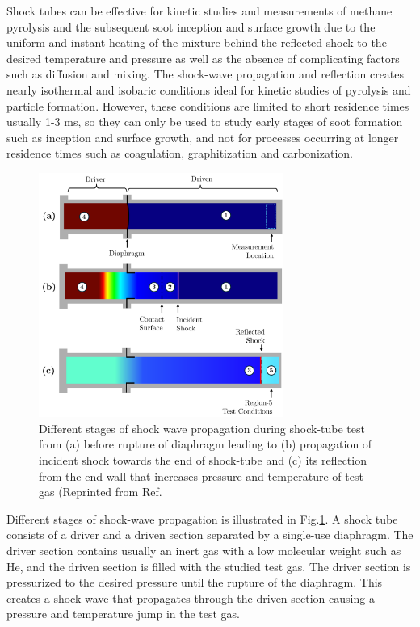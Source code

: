 Shock tubes can be effective for kinetic studies and measurements of methane pyrolysis and the subsequent soot inception and surface growth due to the uniform and instant heating of the mixture behind the reflected shock to the desired temperature and pressure as well as the absence of complicating factors such as diffusion and mixing. The shock-wave propagation and reflection creates nearly isothermal and isobaric conditions ideal for kinetic studies of pyrolysis and particle formation. However, these conditions are limited to short residence times usually 1-3 ms, so they can only be used to study early stages of soot formation such as inception and surface growth, and not for processes occurring at longer residence times such as coagulation, graphitization and carbonization.

\begin{figure}[!htbp]
	\centering
	\includegraphics[height=80mm, ]{Figures/Results/Shocktube/shockwavestages.pdf}
	\caption{Different stages of shock wave propagation during shock-tube test from (a) before rupture of diaphragm leading to (b) propagation of incident shock towards the end of shock-tube and (c) its reflection from the end wall that increases pressure and temperature of test gas (Reprinted from Ref.~\citep{HansonGroupShockTube}}
	\label{fig:shockwave}
\end{figure}

Different stages of shock-wave propagation is illustrated in Fig.\ref{fig:shockwave}. A shock tube consists of a driver and a driven section separated by a single-use diaphragm. The driver section contains usually an inert gas with a low molecular weight such as He, and the driven section is filled with the studied test gas. The driver section is pressurized to the desired pressure until the rupture of the diaphragm. This creates a shock wave that propagates through the driven section causing a pressure and temperature jump in the test gas. 

